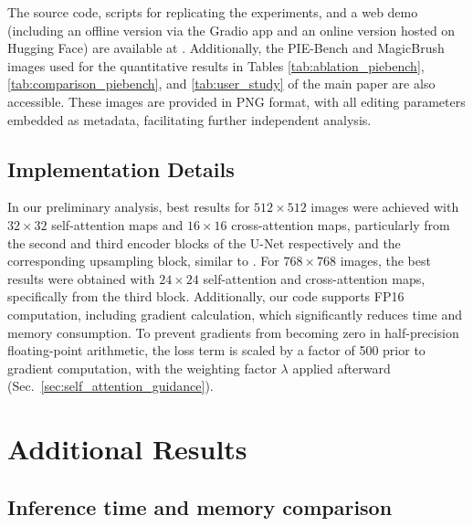 The source code, scripts for replicating the experiments, and a web demo (including an offline version via the Gradio app and an online version hosted on Hugging Face) are available at \codeurl{}. Additionally, the PIE-Bench and MagicBrush images used for the quantitative results in Tables \ref{tab:ablation_piebench}, \ref{tab:comparison_piebench}, and \ref{tab:user_study} of the main paper are also accessible. These images are provided in PNG format, with all editing parameters embedded as metadata, facilitating further independent analysis.

\subsection{Implementation Details}
\label{sec:sup_sourcecode_details}

In our preliminary analysis, best results for $512 \times 512$ images were achieved with $32 \times 32$ self-attention maps and $16 \times 16$ cross-attention maps, particularly from the second and third encoder blocks of the U-Net respectively and the corresponding upsampling block, similar to \cite{hertz2023prompt}. For $ 768 \times 768 $ images, the best results were obtained with $ 24 \times 24 $ self-attention and cross-attention maps, specifically from the third block. Additionally, our code supports FP16 computation, including gradient calculation, which significantly reduces time and memory consumption. To prevent gradients from becoming zero in half-precision floating-point arithmetic, the loss term is scaled by a factor of 500 prior to gradient computation, with the weighting factor $\lambda$ applied afterward (Sec.~\ref{sec:self_attention_guidance}).



\section{Additional Results}
\label{sec:sup_results}

\subsection{Inference time and memory comparison}
\label{sec:sup_results_time}



